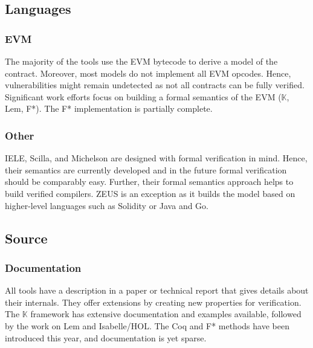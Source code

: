 \subsection{Languages} 
\subsubsection{EVM}
The majority of the tools use the EVM bytecode to derive a model of the contract. Moreover, most models do not implement all EVM opcodes. Hence, vulnerabilities might remain undetected as not all contracts can be fully verified.
Significant work efforts focus on building a formal semantics of the EVM ($\mathbb{K}$, Lem, F*). 
The F* implementation is partially complete. 

\subsubsection{Other}
IELE, Scilla, and Michelson are designed with formal verification in mind. 
Hence, their semantics are currently developed and in the future formal verification should be comparably easy. 
Further, their formal semantics approach helps to build verified compilers.
ZEUS is an exception as it builds the model based on higher-level languages such as Solidity or Java and Go. 


\subsection{Source} 
\subsubsection{Documentation}
All tools have a description in a paper or technical report that gives details about their internals. They offer extensions by creating new properties for verification.
The $\mathbb{K}$ framework has extensive documentation and examples available, followed by the work on Lem and Isabelle/HOL. The Coq and F* methods have been introduced this year, and documentation is yet sparse.

